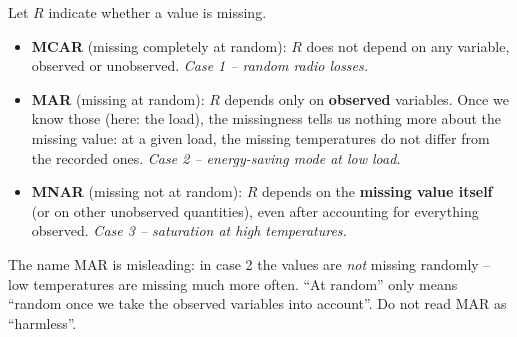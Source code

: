 \documentclass[
  letterpaper,
  DIV=11,
  numbers=noendperiod]{scrreprt}
\providecommand{\tightlist}{%
  \setlength{\itemsep}{0pt}\setlength{\parskip}{0pt}}\usepackage{longtable,booktabs,array}
\begin{document}
\begin{tcolorbox}[enhanced jigsaw, left=2mm, title=\textcolor{quarto-callout-note-color}{\faInfo}\hspace{0.5em}{Definition: Missing data mechanisms}, opacityback=0, breakable, rightrule=.15mm, arc=.35mm, toptitle=1mm, colbacktitle=quarto-callout-note-color!10!white, opacitybacktitle=0.6, coltitle=black, colframe=quarto-callout-note-color-frame, bottomrule=.15mm, leftrule=.75mm, bottomtitle=1mm, titlerule=0mm, toprule=.15mm, colback=white]

Let \(R\) indicate whether a value is missing.

\begin{itemize}
\tightlist
\item
  \textbf{MCAR} (missing completely at random): \(R\) does not depend on
  any variable, observed or unobserved. \emph{Case 1 -- random radio
  losses.}
\item
  \textbf{MAR} (missing at random): \(R\) depends only on
  \textbf{observed} variables. Once we know those (here: the load), the
  missingness tells us nothing more about the missing value: at a given
  load, the missing temperatures do not differ from the recorded ones.
  \emph{Case 2 -- energy-saving mode at low load.}
\item
  \textbf{MNAR} (missing not at random): \(R\) depends on the
  \textbf{missing value itself} (or on other unobserved quantities),
  even after accounting for everything observed. \emph{Case 3 --
  saturation at high temperatures.}
\end{itemize}

\end{tcolorbox}

\begin{tcolorbox}[enhanced jigsaw, left=2mm, title=\textcolor{quarto-callout-warning-color}{\faExclamationTriangle}\hspace{0.5em}{Pitfall: ``missing at random'' is not random}, opacityback=0, breakable, rightrule=.15mm, arc=.35mm, toptitle=1mm, colbacktitle=quarto-callout-warning-color!10!white, opacitybacktitle=0.6, coltitle=black, colframe=quarto-callout-warning-color-frame, bottomrule=.15mm, leftrule=.75mm, bottomtitle=1mm, titlerule=0mm, toprule=.15mm, colback=white]

The name MAR is misleading: in case 2 the values are \emph{not} missing
randomly -- low temperatures are missing much more often. ``At random''
only means ``random once we take the observed variables into account''.
Do not read MAR as ``harmless''.

\end{tcolorbox}
\end{document}
